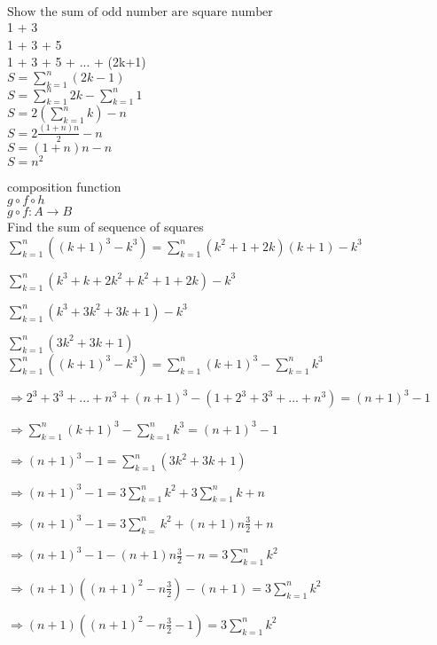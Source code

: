 \documentclass[10pt]{article}
\begin{document}
\begin{flushleft}
$\text{Show the sum of odd number are square number}$
\\
1 + 3\\
1 + 3 + 5 \\
1 + 3 + 5 + ... + (2k+1) \\
\medskip
$S = \sum_{k=1}^{n} (2k-1)$ \\
$S = \sum_{k=1}^{n} 2k - \sum_{k=1}^{n} 1$ \\
$S = 2(\sum_{k=1}^{n} k) - n $ \\
$S = 2 \frac{(1+n)n}{2} - n$ \\
$S = (1+n)n - n$ \\
$S = n^2 $ \\
\end{flushleft}


composition function \\
$g \circ f \circ h $ \\
$g \circ f \colon A\to B$ \\

Find the sum of sequence of squares\\

$\sum_{k=1}^{n}((k+1)^3 - k^3) = \sum_{k=1}^{n}(k^2+1+2k)(k+1) - k^3$

$\sum_{k=1}^{n} (k^3+k+2k^2+k^2+1+2k)-k^3$

$\sum_{k=1}^{n} (k^3+3k^2+3k+1)-k^3$

$\sum_{k=1}^{n} (3k^2+3k+1)$ \\

$\sum_{k=1}^{n} ((k+1)^3-k^3) = \sum_{k=1}^{n} (k+1)^3 - \sum_{k=1}^{n} k^3$

$\Rightarrow 2^3 + 3^3 + ... + n^3 + (n+1)^3 - (1 + 2^3 + 3^3 + ... + n^3) = (n+1)^3 -1$

$\Rightarrow  \sum_{k=1}^{n}(k+1)^3 - \sum_{k=1}^{n}k^3 =(n+1)^3 - 1$

$\Rightarrow (n+1)^3-1 = \sum_{k=1}^{n}(3k^2+3k+1) $

$\Rightarrow (n+1)^3-1 = 3\sum_{k=1}^{n} k^2 +  3\sum_{k=1}^{n} k + n $

$\Rightarrow (n+1)^3-1 = 3\sum_{k=}^{n} k^2 + (n+1) n \frac{3}{2} + n$

$\Rightarrow (n+1)^3-1 -  (n+1) n \frac{3}{2} - n= 3\sum_{k=1}^{n} k^2 $

$\Rightarrow (n+1)((n+1)^2-n \frac{3}{2})-(n+1) = 3\sum_{k=1}^{n} k^2$

$\Rightarrow (n+1)( (n+1)^2 -n\frac{3}{2}-1) = 3\sum_{k=1}^{n} k^2 $	
\end{document}
